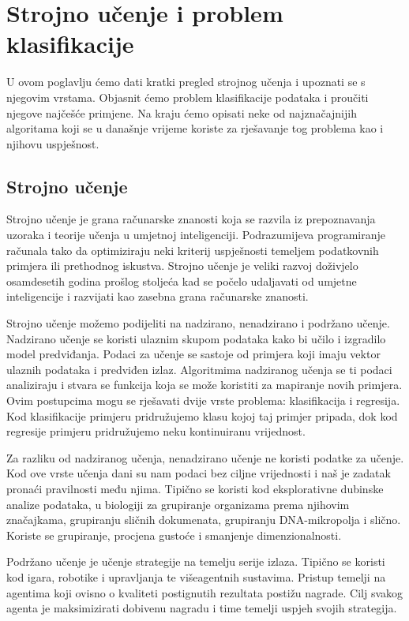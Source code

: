 \documentclass[times, utf8, zavrsni]{fer}
\begin{document}
\chapter{Strojno učenje i problem klasifikacije}
U ovom poglavlju ćemo dati kratki pregled strojnog učenja i upoznati se s njegovim vrstama. Objasnit ćemo problem klasifikacije podataka i proučiti njegove najčešće primjene. Na kraju ćemo opisati neke od najznačajnijih algoritama koji se u današnje vrijeme koriste za rješavanje tog problema kao i njihovu uspješnost.

\section{Strojno učenje}
Strojno učenje je grana računarske znanosti koja se razvila iz prepoznavanja uzoraka i teorije učenja u umjetnoj inteligenciji. Podrazumijeva programiranje računala tako da optimiziraju neki kriterij uspješnosti temeljem podatkovnih primjera ili prethodnog iskustva. Strojno učenje je veliki razvoj doživjelo osamdesetih godina prošlog stoljeća kad se počelo udaljavati od umjetne inteligencije i razvijati kao zasebna grana računarske znanosti.

Strojno učenje možemo podijeliti na nadzirano, nenadzirano i podržano učenje. Nadzirano učenje se koristi ulaznim skupom podataka kako bi učilo i izgradilo model predviđanja. Podaci za učenje se sastoje od primjera koji imaju vektor ulaznih podataka i predviđen izlaz. Algoritmima nadziranog učenja se ti podaci analiziraju i stvara se funkcija koja se može koristiti za mapiranje novih primjera. Ovim postupcima mogu se rješavati dvije vrste problema: klasifikacija i regresija. Kod klasifikacije primjeru pridružujemo klasu kojoj taj primjer pripada, dok kod regresije primjeru pridružujemo neku kontinuiranu vrijednost.

Za razliku od nadziranog učenja, nenadzirano učenje ne koristi podatke za učenje. Kod ove vrste učenja dani su nam podaci bez ciljne vrijednosti i naš je zadatak pronaći pravilnosti među njima. Tipično se koristi kod eksplorativne dubinske analize podataka, u biologiji za grupiranje organizama prema njihovim značajkama, grupiranju sličnih dokumenata, grupiranju DNA-mikropolja i slično. Koriste se grupiranje, procjena gustoće i smanjenje dimenzionalnosti.

Podržano učenje je učenje strategije na temelju serije izlaza. Tipično se koristi kod igara, robotike i upravljanja te višeagentnih sustavima. Pristup temelji na agentima koji ovisno o kvaliteti postignutih rezultata postižu nagrade. Cilj svakog agenta je maksimizirati dobivenu nagradu i time temelji uspjeh svojih strategija. 
\end{document}
